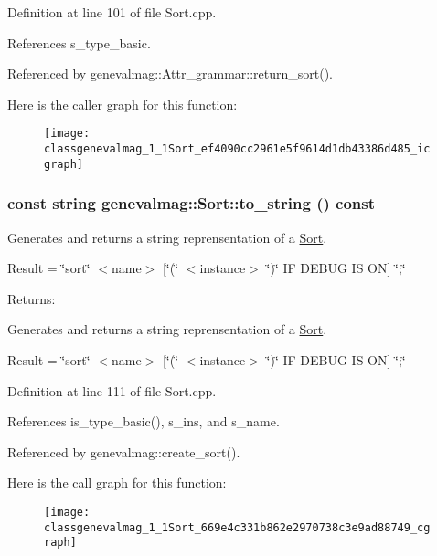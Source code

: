 Definition at line 101 of file Sort.cpp.

References s\_\-type\_\-basic.

Referenced by genevalmag::Attr\_\-grammar::return\_\-sort().

Here is the caller graph for this function:\nopagebreak
\begin{figure}[H]
\begin{center}
\leavevmode
\texttt{[image: classgenevalmag\_1\_1Sort\_ef4090cc2961e5f9614d1db43386d485\_icgraph]}
\end{center}
\end{figure}
\hypertarget{classgenevalmag_1_1Sort_669e4c331b862e2970738c3e9ad88749}{
\subsubsection[{to\_\-string}]{\setlength{\rightskip}{0pt plus 5cm}const string genevalmag::Sort::to\_\-string () const}}
\label{classgenevalmag_1_1Sort_669e4c331b862e2970738c3e9ad88749}


Generates and returns a string reprensentation of a \hyperlink{classgenevalmag_1_1Sort}{Sort}.\par
 \par
 Result = \char`\"{}sort\char`\"{} $<$name$>$ \mbox{[}\char`\"{}(\char`\"{} $<$instance$>$ \char`\"{})\char`\"{} IF DEBUG IS ON\mbox{]} \char`\"{};\char`\"{}\par
 \begin{Desc}
\item[Returns:]\end{Desc}
Generates and returns a string reprensentation of a \hyperlink{classgenevalmag_1_1Sort}{Sort}.

Result = \char`\"{}sort\char`\"{} $<$name$>$ \mbox{[}\char`\"{}(\char`\"{} $<$instance$>$ \char`\"{})\char`\"{} IF DEBUG IS ON\mbox{]} \char`\"{};\char`\"{} 

Definition at line 111 of file Sort.cpp.

References is\_\-type\_\-basic(), s\_\-ins, and s\_\-name.

Referenced by genevalmag::create\_\-sort().

Here is the call graph for this function:\nopagebreak
\begin{figure}[H]
\begin{center}
\leavevmode
\texttt{[image: classgenevalmag\_1\_1Sort\_669e4c331b862e2970738c3e9ad88749\_cgraph]}
\end{center}
\end{figure}


